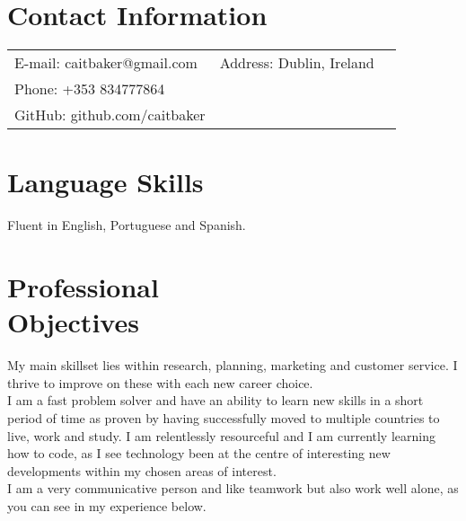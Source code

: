 \documentclass[margin,line]{resume}
\begin{document}
\begin{resume}

    \section{\mysidestyle Contact Information}

    \begin{tabular}{ l c l}
   E-mail: caitbaker@gmail.com &  Address: Dublin, Ireland\\
   Phone: +353 834777864\\
   GitHub: github.com/caitbaker\\
    \end{tabular}

    \section{\mysidestyle Language Skills}
       Fluent in English, Portuguese and Spanish.

    \section{\mysidestyle Professional \\ Objectives}
    My main skillset lies within research, planning, marketing and customer service. I thrive to improve on these with each new career choice.\vspace{1mm}\\%
    I am a fast problem solver and have an ability to learn new skills in a short period of time as proven by having successfully moved to multiple countries to live, work and study. I am relentlessly resourceful and I am currently learning how to code, as I see technology been at the centre of interesting new developments within my chosen areas of interest.\vspace{1mm}\\%
    I am a very communicative person and like teamwork but also work well alone, as you can see in my experience below.\vspace*{1mm}\\%
    

\end{resume}
\end{document}
